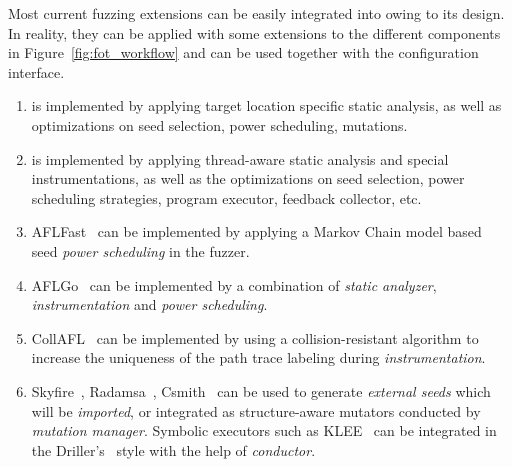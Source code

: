 Most current fuzzing extensions can be easily integrated into {\FOT} owing to its design. In reality, they can be applied with some extensions to the different components in Figure~\ref{fig:fot_workflow} and can be used together with the configuration interface. 

\begin{enumerate}[1)]
	\item \dFOT is implemented by applying target location specific static analysis, as well as optimizations on seed selection, power scheduling, mutations.
	\item \mtfuzz is implemented by applying thread-aware static analysis and special instrumentations, as well as the optimizations on seed selection, power scheduling strategies, program executor, feedback collector, etc.
	\item AFLFast~\cite{Bohme:2016:CGF} can be implemented by applying a Markov Chain model based seed \emph{power scheduling} in the fuzzer. 
	\item AFLGo~\cite{Bohme:2017:DGF} can be implemented by a combination of \emph{static analyzer}, \emph{instrumentation} and \emph{power scheduling}.
	\item CollAFL~\cite{CollAFL} can be implemented by using a collision-resistant algorithm to increase the uniqueness of the path trace labeling during \emph{instrumentation}.
	\item Skyfire~\cite{junjie:2017sp:skyfire}, Radamsa~\cite{radamsa}, Csmith~\cite{csmith} can be used to generate \emph{external seeds} which will be \emph{imported}, or integrated as structure-aware mutators conducted by \emph{mutation manager}. Symbolic executors such as KLEE~\cite{klee} can be integrated in the Driller's~\cite{driller} style with the help of \emph{conductor}.
\end{enumerate}

